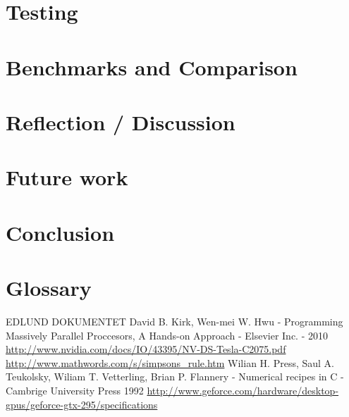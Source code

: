 \documentclass[oribibl]{llncs}
\begin{document}
	\section{Testing}
		
	
	\label{testing}
		
	\section{Benchmarks and Comparison}

	
	\label{bandc}
	
	\section{Reflection / Discussion}		
		
	
	\label{reflection}
		
	\section{Future work}
	
	
	\label{futurework}
	
	\section{Conclusion}
	
	
	\label{conclusion}
		
	\section{Glossary}
	
	
		
	\begin{thebibliography}{9}
			 EDLUND DOKUMENTET
			 David B. Kirk, Wen-mei W. Hwu - Programming Massively Parallel Proccesors, A Hands-on Approach - Elsevier Inc. - 2010
			 \url{http://www.nvidia.com/docs/IO/43395/NV-DS-Tesla-C2075.pdf}
			 \url{http://www.mathwords.com/s/simpsons_rule.htm}
			 Wilian H. Press, Saul A. Teukolsky, Wiliam T. Vetterling, Brian P. Flannery - Numerical recipes in C - Cambrige University Press 1992
			 \url{http://www.geforce.com/hardware/desktop-gpus/geforce-gtx-295/specifications}
	\end{thebibliography}
	
\end{document}
